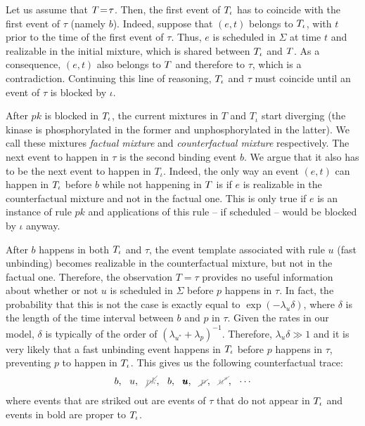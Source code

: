 Let us assume that $T \!=\! \tau$. Then, the first event of
$T_\iota$ has to coincide with the first event of $\tau$ (namely $b$).
Indeed, suppose that $(e, t)$ belongs to $T_\iota$, with $t$ prior to
the time of the first event of $\tau$. Thus, $e$ is scheduled in
$\Sigma$ at time $t$ and realizable in the initial mixture, which is
shared between $T_\iota$ and $T$. As a consequence, $(e, t)$
also belongs to $T$ and therefore to $\tau$, which is a
contradiction. Continuing this line of reasoning, $T_\iota$ and $\tau$
must coincide until an event of $\tau$ is blocked by $\iota$.

After $pk$ is blocked in $T_\iota$, the current mixtures in $T$ and
$T_\iota$ start diverging (the kinase is phosphorylated in the former
and unphosphorylated in the latter). We call these mixtures
\emph{factual mixture} and \emph{counterfactual mixture} respectively.
The next event to happen in $\tau$ is the second binding event $b$. We
argue that it also has to be the next event to happen in
$T_\iota$. Indeed, the only way an event $(e, t)$ can happen in
$T_\iota$ before $b$ while not happening in $T$ is if $e$ is
realizable in the counterfactual mixture and not in the factual
one. This is only true if $e$ is an instance of rule $pk$ and
applications of this rule -- if scheduled -- would be blocked by
$\iota$ anyway.

After $b$ happens in both $T_\iota$ and $\tau$, the event template
associated with rule $u$ (fast unbinding) becomes realizable in the
counterfactual mixture, but not in the factual one. Therefore, the
observation $T\!=\!\tau$ provides no useful information about whether
or not $u$ is scheduled in $\Sigma$ before $p$ happens in $\tau$. In
fact, the probability that this is not the case is exactly equal to
$\exp(-\lambda_u\delta)$, where $\delta$ is the length of the time
interval between $b$ and $p$ in $\tau$. Given the rates in our model,
$\delta$ is typically of the order of
$(\lambda_{u^*}+\lambda_p)^{-1}$. Therefore, $\lambda_u\delta \gg 1$
and it is very likely that a fast unbinding event happens in $T_\iota$
before $p$ happens in $\tau$, preventing $p$ to happen in $T_\iota$.
This gives us the following counterfactual trace:
\begin{align}
  \label{counterfactual-trace} 
  b,\ \ u,\ \ \strikeout{pk}, \ \ b, \ \ \pmb{u}, \ \ \strikeout{\,p\,}, 
  \ \ \strikeout{u^*}, \ \ \cdots
\end{align} 
where events that are striked out are events of $\tau$ that do not
appear in $T_\iota$ and events in bold are proper to $T_\iota$.


